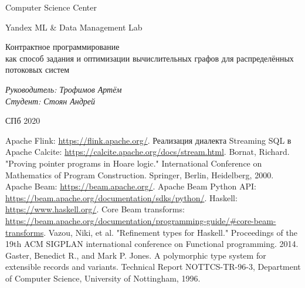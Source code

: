 \documentclass[a4paper,12pt]{article}
\begin{document}
\thispagestyle{empty}
\begin{center}
    Computer Science Center

    Yandex ML \& Data Management Lab
\end{center}
\vspace{13ex}

\begin{center}
    \vspace{16ex}
    \begin{spacing}{1.5}
        {\Large Контрактное программирование \\как способ задания и оптимизации вычислительных графов для распределённых потоковых систем}
    \end{spacing}
\end{center}
\vfill
\begin{flushright}
    \noindent
    \textit{Руководитель: Трофимов Артём} \\
    \textit{Студент: Стоян Андрей}
\end{flushright}
\vspace{5ex}
\begin{center}
    СПб 2020
\end{center}
\newpage

\tableofcontents
\newpage


\newpage

\newpage

\newpage

\newpage





\begin{thebibliography}{9}
     Apache Flink: \url{https://flink.apache.org/}.
     Реализация диалекта Streaming SQL в Apache Calcite: \url{https://calcite.apache.org/docs/stream.html}.
     Bornat, Richard. "Proving pointer programs in Hoare logic." International Conference on Mathematics of Program Construction. Springer, Berlin, Heidelberg, 2000.
     Apache Beam: \url{https://beam.apache.org/}.
     Apache Beam Python API: \url{https://beam.apache.org/documentation/sdks/python/}.
     Haskell: \url{https://www.haskell.org/}.
     Core Beam transforms: \url{https://beam.apache.org/documentation/programming-guide/#core-beam-transforms}.
     Vazou, Niki, et al. "Refinement types for Haskell." Proceedings of the 19th ACM SIGPLAN international conference on Functional programming. 2014.
     Gaster, Benedict R., and Mark P. Jones. A polymorphic type system for extensible records and variants. Technical Report NOTTCS-TR-96-3, Department of Computer Science, University of Nottingham, 1996.
\end{thebibliography}
\end{document}
